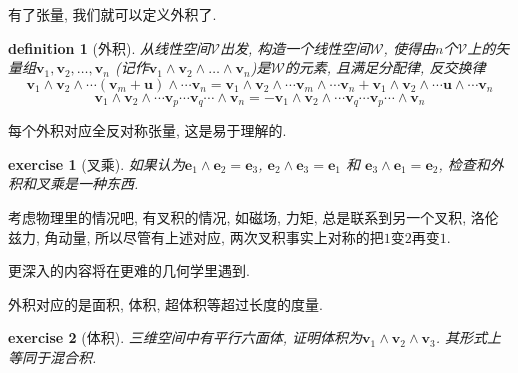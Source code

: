 \documentclass[12pt]{ctexbook}
\newtheorem{definition}{definition}
\numberwithin{definition}{section}
\numberwithin{theorem}{section}
\newtheorem{exercise}{exercise}
\numberwithin{exercise}{section}
\numberwithin{example}{section}
\numberwithin{lemma}{section}
\begin{document}

    有了张量, 我们就可以定义外积了.

    \begin{definition}
        [外积] 从线性空间\(\mathcal{V}\)出发, 构造一个线性空间\(\mathcal{W}\),
        使得由\(n\)个\(\mathcal{V}\)上的矢量组\(\boldsymbol{v}_1, \boldsymbol{v}_2, \ldots, \boldsymbol{v}_n\)
        (记作\(\boldsymbol{v}_1 \wedge \boldsymbol{v}_2 \wedge \ldots \wedge \boldsymbol{v}_n\))是\(\mathcal{W}\)的元素, 且满足分配律, 反交换律
        \begin{equation}
            \boldsymbol{v}_1 \wedge \boldsymbol{v}_2 \wedge \cdots (\boldsymbol{v}_m + \boldsymbol{u}) \wedge \cdots \boldsymbol{v}_n = 
            \boldsymbol{v}_1 \wedge \boldsymbol{v}_2 \wedge \cdots \boldsymbol{v}_m \wedge \cdots \boldsymbol{v}_n + \boldsymbol{v}_1 \wedge \boldsymbol{v}_2 \wedge \cdots \boldsymbol{u} \wedge \cdots \boldsymbol{v}_n
        \end{equation}
        \begin{equation}
            \boldsymbol{v}_1 \wedge \boldsymbol{v}_2 \wedge \cdots \boldsymbol{v}_p \cdots \boldsymbol{v}_q \cdots \wedge \boldsymbol{v}_n = 
            - \boldsymbol{v}_1 \wedge \boldsymbol{v}_2 \wedge \cdots \boldsymbol{v}_q \cdots \boldsymbol{v}_p \cdots \wedge \boldsymbol{v}_n
        \end{equation}
    \end{definition}

    每个外积对应全反对称张量, 这是易于理解的.

    \begin{exercise}
        [叉乘] 如果认为\(\boldsymbol{e}_1 \wedge \boldsymbol{e}_2 = \boldsymbol{e}_3\),
        \(\boldsymbol{e}_2 \wedge \boldsymbol{e}_3 = \boldsymbol{e}_1\) 和 \(\boldsymbol{e}_3 \wedge \boldsymbol{e}_1 = \boldsymbol{e}_2\),
        检查和外积和叉乘是一种东西.
    \end{exercise}

    考虑物理里的情况吧, 有叉积的情况, 如磁场, 力矩, 总是联系到另一个叉积, 洛伦兹力, 角动量, 所以尽管有上述对应, 两次叉积事实上对称的把\(1\)变\(2\)再变\(1\).

    更深入的内容将在更难的几何学里遇到.

    外积对应的是面积, 体积, 超体积等超过长度的度量.

    \begin{exercise}
        [体积] 三维空间中有平行六面体, 证明体积为\(\boldsymbol{v}_1 \wedge \boldsymbol{v}_2 \wedge \boldsymbol{v}_3\).
        其形式上等同于混合积.
    \end{exercise}
\end{document}
